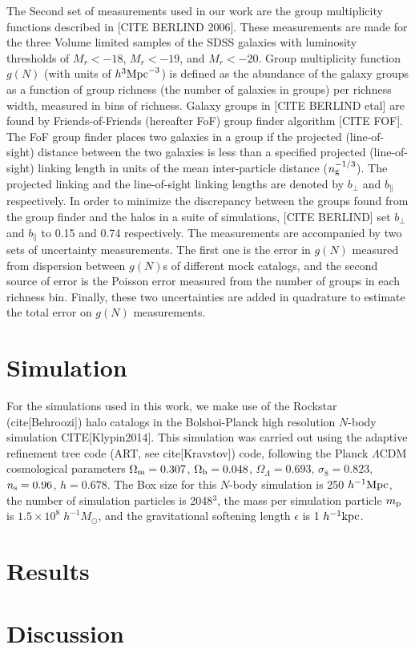 \documentclass[12pt, preprint]{aastex}
\begin{document}
The Second set of measurements used in our work are the group multiplicity functions described in [CITE BERLIND 2006]. These measurements are made 
for the three Volume limited samples of the SDSS galaxies with luminosity thresholds of $M_{r}<-18$, $M_{r}<-19$, and $M_{r}<-20$. 
Group multiplicity function $g(N)$ (with units of $h^{3}\rm{Mpc}^{-3}$) is defined as the abundance of the galaxy groups as a 
function of group richness (the number of galaxies in groups) per richness width, measured in bins of richness. 
Galaxy groups in [CITE BERLIND etal] are found by Friends-of-Friends (hereafter FoF) group finder algorithm [CITE FOF]. 
The FoF group finder places two galaxies in a group if the projected (line-of-sight) distance between the two galaxies 
is less than a specified projected (line-of-sight) linking length in units of the mean inter-particle distance ($n_{\rm g}^{-1/3}$).
The projected linking and the line-of-sight linking lengths are denoted by $b_{\perp}$ and $b_{\parallel}$ respectively. 
In order to minimize the discrepancy between the groups found from the group finder and the halos in a suite of simulations, 
[CITE BERLIND] set $b_{\perp}$ and $b_{\parallel}$ to 0.15 and 0.74 respectively.
The measurements are accompanied by two sets of uncertainty measurements. 
The first one is the error in $g(N)$ measured from dispersion between $g(N)$s 
of different mock catalogs, and the second source of error is the Poisson error measured 
from the number of groups in each richness bin. Finally, these two uncertainties are added in quadrature 
to estimate the total error on $g(N)$ measurements.

\section{Simulation}
For the simulations used in this work, we make use of the Rockstar (cite[Behroozi]) halo catalogs in the Bolshoi-Planck high 
resolution $N$-body simulation CITE[Klypin2014]. This simulation was carried out using the adaptive refinement tree code 
(ART, see cite[Kravstov]) code, following the Planck $\Lambda$CDM cosmological parameters 
$\Omega_{\rm m} = 0.307$, $\Omega_{\rm b} = 0.048$, $\Omega_{\Lambda} = 0.693$, $\sigma_{8} = 0.823$, $n_{\rm s}=0.96$, 
$h=0.678$. The Box size for this $N$-body simulation is 250 $h^{-1} \rm{Mpc}$, the number of simulation particles is 2048$^3$, 
the mass per simulation particle $m_{\rm p}$ is $1.5 \times 10^{8} \; h^{-1} M_{\odot}$, and the gravitational softening length 
$\epsilon$ is 1 $h^{-1} \rm{kpc}$. 

\section{Results}



\section{Discussion}
\end{document}
